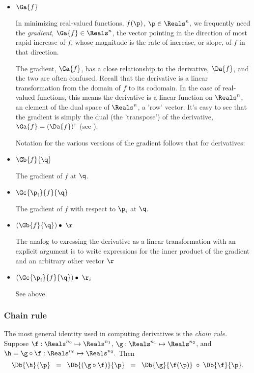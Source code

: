 \begin{itemize}

\item $\Ga{f}$

In minimizing real-valued functions, $f(\p)$, $\p \in \Reals^n$,
we frequently need
the {\it gradient,} $\Ga{f} \in \Reals^n$,
the vector pointing in the direction of most rapid increase of $f$,
whose magnitude is the rate of increase, or slope,
of $f$ in that direction.

The gradient, $\Ga{f}$,
has a close relationship to the derivative, $\Da{f}$,
and the two are often confused.
Recall that the derivative is a linear transformation
from the domain of $f$ to its codomain.
In the case of real-valued functions,
this means the derivative is a linear function on $\Reals^n$,
an element of the dual space of $\Reals^n$, a 'row' vector.
It's easy to see that the gradient is simply the dual (the 'transpose')
of the derivative, $\Ga{f} = (\Da{f})^{\dagger}$
(see \cite[p. 96, ex. 4-18]{Spivak:1965:CalculusOnManifolds}).

Notation for the various versions of the gradient
follows that for derivatives:

\item $\Gb{f}{\q}$

The gradient of $f$ at $\q$.

\item $\Gc{\p_i}{f}{\q}$

The gradient of $f$
with respect to $\p_i$ at $\q$.

\item $(\Gb{f}{\q}) \bullet \; \r$

The analog to exressing the derivative as a linear transformation
with an explicit argument is to write expressions for
the inner product of the gradient and an arbitrary other vector $\r$

\item $(\Gc{\p_i}{f}{\q}) \bullet \;\r_i$

See above.

\end{itemize}



\subsubsection{Chain rule}
\label{sec:chain}

The most general identity used in computing derivatives is the {\it chain rule.}
Suppose
$\f:\Reals^{n_0} \mapsto \Reals^{n_1}$,
$\g:\Reals^{n_1} \mapsto \Reals^{n_2}$,
and
$\h = \g \circ \f : \Reals^{n_0} \mapsto \Reals^{n_2}.$
Then
\begin{equation}
\label{eq:chain-rule}
\Db{\h}{\p} \;\; = \;\; \Db{(\g \circ \f)}{\p}
            \;\; = \;\; \Db{\g}{\f(\p)} \; \circ \; \Db{\f} {\p}.
\end{equation}

